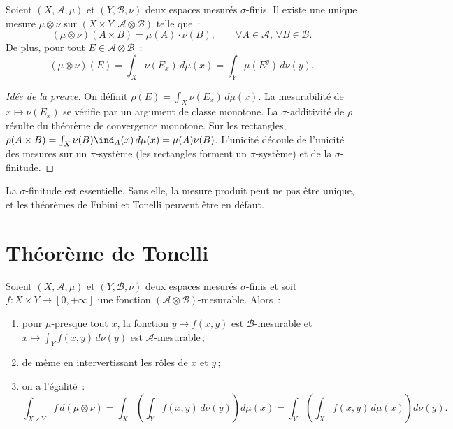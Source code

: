 \begin{theoreme}
\label{thm:mesure_produit}
Soient $(X, \mathcal{A}, \mu)$ et $(Y, \mathcal{B}, \nu)$ deux espaces mesur\'es
$\sigma$-finis. Il existe une unique mesure $\mu \otimes \nu$ sur
$(X \times Y, \mathcal{A} \otimes \mathcal{B})$ telle que~:
\[
    (\mu \otimes \nu)(A \times B) = \mu(A) \cdot \nu(B),
    \qquad \forall A \in \mathcal{A},\, \forall B \in \mathcal{B}.
\]
De plus, pour tout $E \in \mathcal{A} \otimes \mathcal{B}$~:
\[
    (\mu \otimes \nu)(E) = \int_X \nu(E_x)\, d\mu(x)
    = \int_Y \mu(E^y)\, d\nu(y).
\]
\end{theoreme}

\begin{proof}[Id\'ee de la preuve]
On d\'efinit $\rho(E) = \int_X \nu(E_x)\, d\mu(x)$. La mesurabilit\'e de
$x \mapsto \nu(E_x)$ se v\'erifie par un argument de classe monotone. La
$\sigma$-additivit\'e de $\rho$ r\'esulte du th\'eor\`eme de convergence monotone.
Sur les rectangles, $\rho(A \times B) = \int_X \nu(B) \ind_A(x)\, d\mu(x) =
\mu(A) \nu(B)$. L'unicit\'e d\'ecoule de l'unicit\'e des mesures sur un $\pi$-syst\`eme
(les rectangles forment un $\pi$-syst\`eme) et de la $\sigma$-finitude.
\end{proof}

\begin{attention}[title=\textbf{Hypoth\`ese de $\sigma$-finitude}]
La $\sigma$-finitude est essentielle. Sans elle, la mesure produit peut ne pas \^etre
unique, et les th\'eor\`emes de Fubini et Tonelli peuvent \^etre en d\'efaut.
\end{attention}

\section{Th\'eor\`eme de Tonelli}

\begin{theoreme}[Tonelli]
\label{thm:tonelli}
Soient $(X, \mathcal{A}, \mu)$ et $(Y, \mathcal{B}, \nu)$ deux espaces mesur\'es
$\sigma$-finis et soit $f : X \times Y \to [0, +\infty]$ une fonction
$(\mathcal{A} \otimes \mathcal{B})$-mesurable. Alors~:
\begin{enumerate}
    \item[(i)] pour $\mu$-presque tout $x$, la fonction $y \mapsto f(x,y)$ est
    $\mathcal{B}$-mesurable et $x \mapsto \int_Y f(x,y)\, d\nu(y)$ est
    $\mathcal{A}$-mesurable\,;
    \item[(ii)] de m\^eme en intervertissant les r\^oles de $x$ et $y$\,;
    \item[(iii)] on a l'\'egalit\'e~:
    \[
        \int_{X \times Y} f\, d(\mu \otimes \nu)
        = \int_X \left(\int_Y f(x,y)\, d\nu(y)\right) d\mu(x)
        = \int_Y \left(\int_X f(x,y)\, d\mu(x)\right) d\nu(y).
    \]
\end{enumerate}
\end{theoreme}


